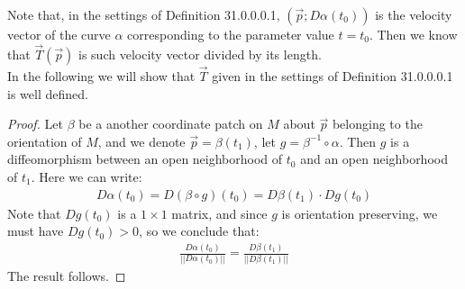 \documentclass[11pt,oneside]{book}
\theoremstyle{break}
\theoremstyle{break}
\begin{document}
Note that, in the settings of Definition 31.0.0.0.1, $(\vec{p};D\alpha(t_0))$ is the velocity vector of the curve $\alpha$ corresponding to the parameter value $t = t_0$. Then we know that $\vec{T}(\vec{p})$ is such velocity vector divided by its length. \\

In the following we will show that $\vec{T}$ given in the settings of Definition 31.0.0.0.1 is well defined.
\begin{proof}
Let $\beta$ be a another coordinate patch on $M$ about $\vec{p}$ belonging to the orientation of $M$, and we denote $\vec{p} = \beta(t_1)$, let $g = \beta^{-1}\circ \alpha$. Then $g$ is a diffeomorphism between an open neighborhood of $t_0$ and an open neighborhood of $t_1$. Here we can write:
\begin{align*}
D\alpha(t_0) = D(\beta \circ g) (t_0) = D\beta(t_1) \cdot Dg(t_0)
\end{align*}
Note that $Dg(t_0)$ is a $1\times 1$ matrix, and since $g$ is orientation preserving, we must have $Dg(t_0) >0$, so we conclude that:
\begin{align*}
\frac{D\alpha(t_0)}{||D\alpha(t_0)||} = \frac{D\beta(t_1)}{||D\beta(t_1)||} 
\end{align*}
The result follows.
\end{proof}
\end{document}
